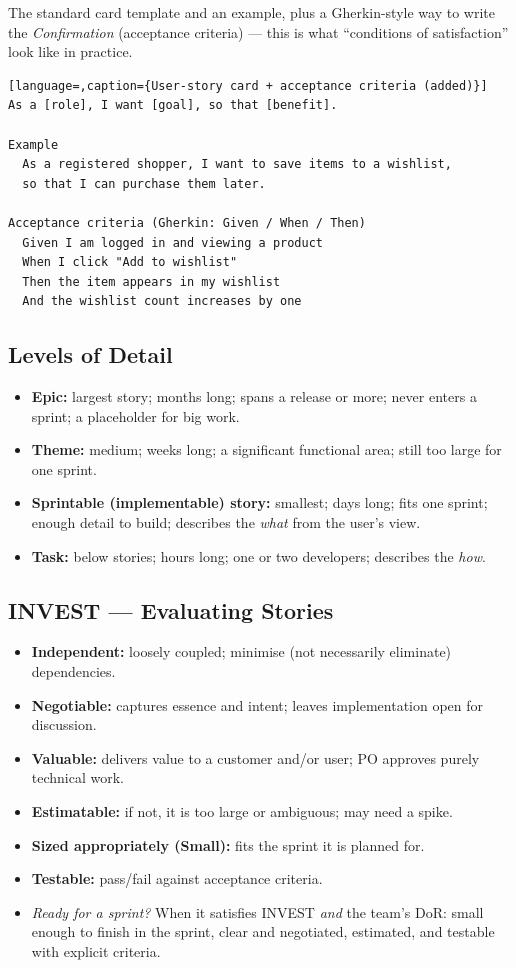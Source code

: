 \documentclass[hidelinks]{article}
\begin{document}
The standard card template and an example, plus a Gherkin-style way to write the
\emph{Confirmation} (acceptance criteria) --- this is what ``conditions of satisfaction'' look like in practice.
\begin{lstlisting}[language=,caption={User-story card + acceptance criteria (added)}]
As a [role], I want [goal], so that [benefit].

Example
  As a registered shopper, I want to save items to a wishlist,
  so that I can purchase them later.

Acceptance criteria (Gherkin: Given / When / Then)
  Given I am logged in and viewing a product
  When I click "Add to wishlist"
  Then the item appears in my wishlist
  And the wishlist count increases by one
\end{lstlisting}

\subsection{Levels of Detail}
\begin{itemize}
  \item \textbf{Epic:} largest story; months long; spans a release or more; never enters a sprint;
        a placeholder for big work.
  \item \textbf{Theme:} medium; weeks long; a significant functional area; still too large for one sprint.
  \item \textbf{Sprintable (implementable) story:} smallest; days long; fits one sprint; enough
        detail to build; describes the \emph{what} from the user's view.
  \item \textbf{Task:} below stories; hours long; one or two developers; describes the \emph{how}.
\end{itemize}

\subsection{INVEST --- Evaluating Stories}
\begin{itemize}
  \item \textbf{Independent:} loosely coupled; minimise (not necessarily eliminate) dependencies.
  \item \textbf{Negotiable:} captures essence and intent; leaves implementation open for discussion.
  \item \textbf{Valuable:} delivers value to a customer and/or user; PO approves purely technical work.
  \item \textbf{Estimatable:} if not, it is too large or ambiguous; may need a spike.
  \item \textbf{Sized appropriately (Small):} fits the sprint it is planned for.
  \item \textbf{Testable:} pass/fail against acceptance criteria.
  \item \emph{Ready for a sprint?} When it satisfies INVEST \emph{and} the team's DoR: small enough
        to finish in the sprint, clear and negotiated, estimated, and testable with explicit criteria.
\end{itemize}
\end{document}
